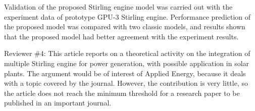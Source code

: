 \documentclass[12pt]{letter}
\begin{document}
\begin{enumerate}
\begin{snugshade*}
Validation of the proposed Stirling engine model was carried out with the experiment data of prototype GPU-3 Stirling engine. Performance prediction of the proposed model was compared with two classic models, and results shown that the proposed model had better agreement with the experiment results.
\end{snugshade*}

\end{enumerate}

\newpage
Reviewer \#4:  This article reports on a theoretical activity on the integration of multiple Stirling engine for power generation, with possible application in solar plants. The argument would be of interest of Applied Energy, because it deals with a topic covered by the journal. However, the contribution is very little, so the article does not reach the minimum threshold for a research paper to be published in an important journal.
\end{document}
